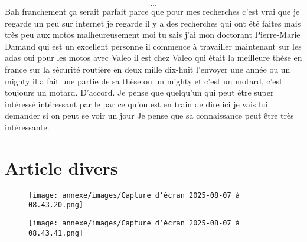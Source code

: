 \[...\]
\ifconfidentiel
Bah franchement ça serait parfait parce que pour mes recherches c'est vrai que je regarde un peu sur internet je regarde il y a des recherches qui ont été faites mais très peu aux motos malheureusement moi tu sais j'ai mon doctorant Pierre-Marie Damand qui est un excellent personne il commence à travailler maintenant sur les adas oui pour les motos avec Valeo il est chez Valeo qui était la meilleure thèse en france sur la sécurité routière en deux mille dix-huit l'envoyer une année ou un mighty il a fait une partie de sa thèse ou un mighty et c'est un motard, c'est toujours un motard. D'accord. Je pense que quelqu'un qui peut être super intéressé intéressant par le par ce qu'on est en train de dire ici je vais lui demander si on peut se voir un jour Je pense que sa connaissance peut être très intéressante.
\fi

\section{Article divers}
\begin{figure}[H]
    \centering
    \texttt{[image: annexe/images/Capture d’écran 2025-08-07 à 08.43.20.png]} 
    \label{articlemoto}
\end{figure}
\begin{figure}[H]
    \centering
    \texttt{[image: annexe/images/Capture d’écran 2025-08-07 à 08.43.41.png]} 

\end{figure}
